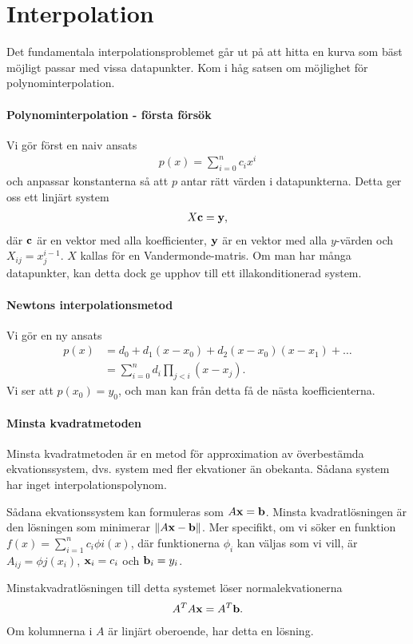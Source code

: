 \section{Interpolation}

Det fundamentala interpolationsproblemet går ut på att hitta en kurva som bäst möjligt passar med vissa datapunkter. Kom i håg satsen om möjlighet för polynominterpolation.

\paragraph{Polynominterpolation - första försök}
Vi gör först en naiv ansats
\begin{align*}
	p(x) = \sum\limits_{i = 0}^{n}c_{i}x^{i}
\end{align*}
och anpassar konstanterna så att $p$ antar rätt värden i datapunkterna. Detta ger oss ett linjärt system
\begin{align*}
	X\vb{c} = \vb{y},
\end{align*}
där $\vb{c}$ är en vektor med alla koefficienter, $\vb{y}$ är en vektor med alla $y$-värden och $X_{ij} = x_{j}^{i - 1}$. $X$ kallas för en Vandermonde-matris. Om man har många datapunkter, kan detta dock ge upphov till ett illakonditionerad system.

\paragraph{Newtons interpolationsmetod}
Vi gör en ny ansats
\begin{align*}
	p(x) &= d_{0} + d_{1}(x - x_{0}) + d_{2}(x - x_{0})(x - x_{1}) + \dots \\
	     &= \sum\limits_{i = 0}^{n}d_{i}\prod\limits_{j < i}(x - x_{j}).
\end{align*}
Vi ser att $p(x_{0}) = y_{0}$, och man kan från detta få de nästa koefficienterna.

\paragraph{Minsta kvadratmetoden}
Minsta kvadratmetoden är en metod för approximation av överbestämda ekvationssystem, dvs. system med fler ekvationer än obekanta. Sådana system har inget interpolationspolynom.

Sådana ekvationssystem kan formuleras som $A\vb{x} = \vb{b}$. Minsta kvadratlösningen är den lösningen som minimerar $\norm{A\vb{x} - \vb{b}}$. Mer specifikt, om vi söker en funktion $f(x) = \sum\limits_{i = 1}^{n}c_{i}\phi{i}(x)$, där funktionerna $\phi_{i}$ kan väljas som vi vill, är $A_{ij} = \phi{j}(x_{i})$, $\vb{x}_{i} = c_{i}$ och $\vb{b}_{i} = y_{i}$.

Minstakvadratlösningen till detta systemet löser normalekvationerna
\begin{align*}
	A^{T}A\vb{x} = A^{T}\vb{b}.
\end{align*}
Om kolumnerna i $A$ är linjärt oberoende, har detta en lösning.